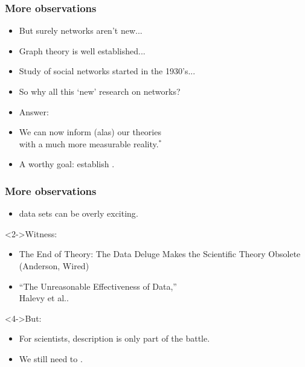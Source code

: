 \begin{frame}
  \frametitle{More observations}

  \begin{itemize}
  \item<1->
    But surely \alert{networks aren't new}...
  \item<2->
    Graph theory is well established...
  \item<3->
    Study of social networks started in the 1930's...
  \item<4->
    So why all this `new' research on networks?
  \item<5->
    \alert{Answer:} 
  \item<6->
    We can now inform (alas) our theories \\
    with a much more measurable reality.$^\ast$
  \item<7-> 
    A worthy goal: establish .

    \medskip
  \end{itemize}
\end{frame}

\begin{frame}
  \frametitle{More observations}

  \begin{itemize}
  \item<1->
     data sets can be overly \alert{exciting}.
  \end{itemize}
  
  \begin{block}<2->{Witness:}
    \begin{itemize}
    \item<2->
      The End of Theory: The Data Deluge Makes the Scientific Theory Obsolete (Anderson, Wired)
    \item<3->
      ``The Unreasonable Effectiveness of Data,''\\ Halevy et al.\cite{halevy2009a}.
    \end{itemize}
  \end{block}

  \begin{block}<4->{But:}
  \begin{itemize}
  \item<4-> 
    For scientists, description is only part of the battle.
  \item<5-> 
    We still need to .
  \end{itemize}
  \end{block}

\end{frame}



